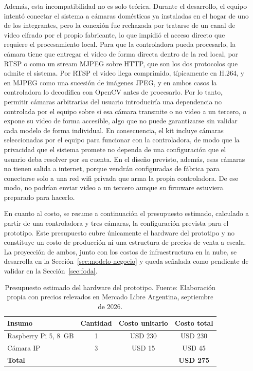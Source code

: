 Además, esta incompatibilidad no es solo teórica.
Durante el desarrollo, el equipo intentó conectar el sistema a cámaras domésticas ya instaladas en el hogar de uno de los integrantes, pero la conexión fue rechazada por tratarse de un canal de video cifrado por el propio fabricante, lo que impidió el acceso directo que requiere el procesamiento local.
Para que la controladora pueda procesarlo, la cámara tiene que entregar el video de forma directa dentro de la red local, por RTSP o como un stream MJPEG sobre HTTP, que son los dos protocolos que admite el sistema.
Por RTSP el video llega comprimido, típicamente en H.264, y en MJPEG como una sucesión de imágenes JPEG, y en ambos casos la controladora lo decodifica con OpenCV antes de procesarlo.
Por lo tanto, permitir cámaras arbitrarias del usuario introduciría una dependencia no controlada por el equipo sobre si esa cámara transmite o no video a un tercero, o expone su video de forma accesible, algo que no puede garantizarse sin validar cada modelo de forma individual.
En consecuencia, el kit incluye cámaras seleccionadas por el equipo para funcionar con la controladora, de modo que la privacidad que el sistema promete no dependa de una configuración que el usuario deba resolver por su cuenta.
En el diseño previsto, además, esas cámaras no tienen salida a internet, porque vendrán configuradas de fábrica para conectarse solo a una red wifi privada que arma la propia controladora.
De ese modo, no podrían enviar video a un tercero aunque su firmware estuviera preparado para hacerlo.

En cuanto al costo, se resume a continuación el presupuesto estimado, calculado a partir de una controladora y tres cámaras, la configuración prevista para el prototipo.
Este presupuesto cubre únicamente el hardware del prototipo y no constituye un costo de producción ni una estructura de precios de venta a escala.
La proyección de ambos, junto con los costos de infraestructura en la nube, se desarrolla en la Sección~\ref{sec:modelo-negocio} y queda señalada como pendiente de validar en la Sección~\ref{sec:foda}.

\begin{table}[h!]
\centering
\caption[Presupuesto estimado del hardware del prototipo.]{Presupuesto estimado del hardware del prototipo. Fuente: Elaboración propia con precios relevados en Mercado Libre Argentina, septiembre de 2026.}
\label{tab:presupuesto-hardware}
\begin{tabular}{lccc}
\toprule
\textbf{Insumo} & \textbf{Cantidad} & \textbf{Costo unitario} & \textbf{Costo total} \\
\midrule
Raspberry Pi 5, 8~GB & 1 & USD 230 & USD 230 \\
Cámara IP & 3 & USD 15 & USD 45 \\
\midrule
\textbf{Total} & & & \textbf{USD 275} \\
\bottomrule
\end{tabular}
\end{table}

